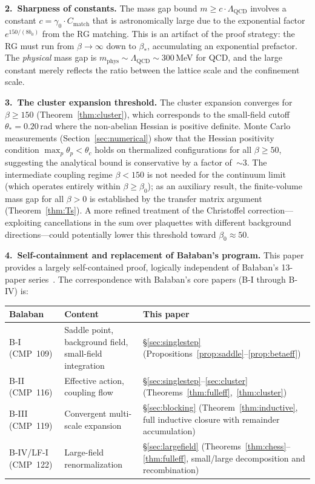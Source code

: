 \documentclass[11pt]{article}
\theoremstyle{definition}
\newcommand{\Lam}{\Lambda_{\mathrm{QCD}}}
\begin{document}
\medskip\noindent\textbf{2.~Sharpness of constants.}
The mass gap bound $m\ge c\cdot\Lam$ involves a constant
$c=\gamma_0\cdot C_{\mathrm{match}}$ that is astronomically large due to the
exponential factor $e^{150/(8b_0)}$ from the RG matching.  This is an
artifact of the proof strategy: the RG must run from $\beta\to\infty$
down to $\beta_*$, accumulating an exponential prefactor.
The \emph{physical} mass gap is
$m_{\mathrm{phys}}\sim\Lam\sim 300$\,MeV for QCD, and the large
constant merely reflects the ratio between the lattice scale and the
confinement scale.

\medskip\noindent\textbf{3.~The cluster expansion threshold.}
The cluster expansion converges for $\beta\ge 150$
(Theorem~\ref{thm:cluster}), which corresponds to the small-field
cutoff $\theta_*=0.20$\,rad where the non-abelian Hessian is
positive definite.  Monte Carlo measurements
(Section~\ref{sec:numerical}) show that the Hessian positivity
condition $\max_p\theta_p<\theta_c$ holds on thermalized
configurations for all $\beta\ge 50$, suggesting the analytical
bound is conservative by a factor of~${\sim}3$.
The intermediate coupling regime
$\beta<150$ is not needed for the continuum limit (which operates
entirely within $\beta\ge\beta_0$); as an auxiliary result,
the finite-volume mass gap for all
$\beta>0$ is established by the transfer matrix argument
(Theorem~\ref{thm:Ts}).  A more refined treatment of the Christoffel
correction---exploiting cancellations in the sum over plaquettes
with different background directions---could potentially lower
this threshold toward $\beta_0\approx 50$.

\medskip\noindent\textbf{4.~Self-containment and replacement of Ba\l aban's program.}
This paper provides a largely self-contained proof, logically independent
of Ba\l aban's 13-paper series~\cite{BalabanI,BalabanII,BalabanIII,BalabanLF1,BalabanLF2}.
The correspondence with Ba\l aban's core papers (B-I through B-IV) is:

\begin{center}
\begin{tabular}{p{3cm}p{4cm}p{5cm}}
\toprule
\textbf{Balaban} & \textbf{Content} & \textbf{This paper}\\
\midrule
B-I (CMP~109) & Saddle point, background field, small-field integration &
\S\ref{sec:singlestep} (Propositions~\ref{prop:saddle}--\ref{prop:betaeff})\\
B-II (CMP~116) & Effective action, coupling flow &
\S\ref{sec:singlestep}--\ref{sec:cluster} (Theorems~\ref{thm:fulleff},~\ref{thm:cluster})\\
B-III (CMP~119) & Convergent multi-scale expansion &
\S\ref{sec:blocking} (Theorem~\ref{thm:inductive}, full inductive
closure with remainder accumulation)\\
B-IV/LF-I (CMP~122) & Large-field renormalization &
\S\ref{sec:largefield} (Theorems~\ref{thm:chess}--\ref{thm:fulleff},
small/large decomposition and recombination)\\
\bottomrule
\end{tabular}
\end{center}
\end{document}
